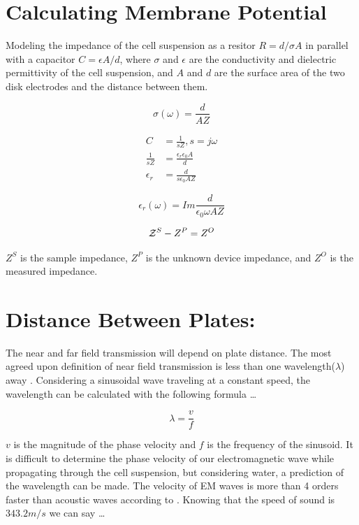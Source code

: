 \documentclass[journal]{IEEEtran}
\begin{document}
\section{Calculating Membrane Potential}
Modeling the impedance of the cell suspension as a resitor $R = d/\sigma A$ in parallel with a capacitor $C = \epsilon A/d$, where $\sigma$ and $\epsilon$ are the conductivity and dielectric permittivity of the cell suspension, and $A$ and $d$ are the surface area of the two disk electrodes and the distance between them. 

\begin{equation}
\label{conductivity}
\sigma(\omega) = \frac{d}{AZ}
\end{equation}

\begin{align*}
C &= \frac{1}{sZ},s=j\omega \\
\frac{1}{sZ} &= \frac{\epsilon_r \epsilon_0 A}{d} \\
\epsilon_r &= \frac{d}{s\epsilon_0 AZ}
\end{align*}

\begin{equation}
\label{permittivity}
\epsilon_r(\omega) = Im\frac{d}{\epsilon_0\omega AZ}
\end{equation}

\begin{equation}
\mathcal Z^S-Z^P = Z^O \\
\end{equation}

$Z^S$ is the sample impedance, $Z^P$ is the unknown device impedance, and $Z^O$ is the measured impedance. \\

\section{Distance Between Plates:}
The near and far field transmission will depend on plate distance. The most agreed upon definition of near field transmission is less than one wavelength($\lambda$) away \cite{near-far-em}. Considering a sinusoidal wave traveling at a constant speed, the wavelength can be calculated with the following formula \ldots

\begin{equation}
\label{wavelength}
\lambda = \frac{v}{f}
\end{equation}

$v$ is the magnitude of the phase velocity and $f$ is the frequency of the sinusoid. It is difficult to determine the phase velocity of our electromagnetic wave while propagating through the cell suspension, but considering water, a prediction of the wavelength can be made. The velocity of EM waves is more than 4 orders faster than acoustic waves according to \cite{wave-propagation-water}. Knowing that the speed of sound is $343.2 m/s$ we can say \ldots
\end{document}
